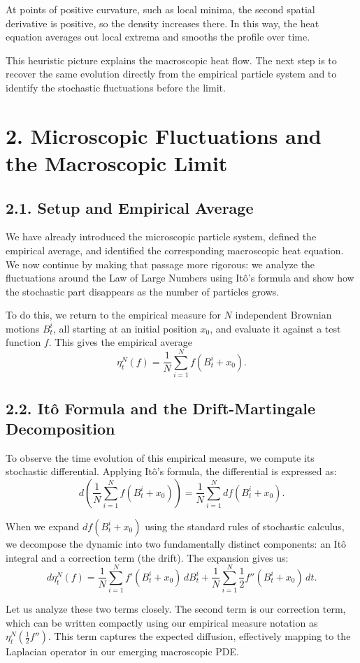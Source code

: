 \documentclass[11pt]{article}
\theoremstyle{definition}
\theoremstyle{remark}
\begin{document}
At points of positive curvature, such as local minima, the second spatial derivative is positive, so the density increases there. In this way, the heat equation averages out local extrema and smooths the profile over time.

This heuristic picture explains the macroscopic heat flow. The next step is to recover the same evolution directly from the empirical particle system and to identify the stochastic fluctuations before the limit.

\section*{2. Microscopic Fluctuations and the Macroscopic Limit}
\subsection*{2.1. Setup and Empirical Average}
We have already introduced the microscopic particle system, defined the empirical average, and identified the corresponding macroscopic heat equation. We now continue by making that passage more rigorous: we analyze the fluctuations around the Law of Large Numbers using It\^o's formula and show how the stochastic part disappears as the number of particles grows.

To do this, we return to the empirical measure for $N$ independent Brownian motions $B_t^i$, all starting at an initial position $x_0$, and evaluate it against a test function $f$. This gives the empirical average
\[
\eta_t^N(f)=\frac{1}{N}\sum_{i=1}^N f(B_t^i+x_0).
\]

\subsection*{2.2. It\^o Formula and the Drift-Martingale Decomposition}
To observe the time evolution of this empirical measure, we compute its stochastic differential. Applying It\^o's formula, the differential is expressed as:
\[
d\!\left(
\frac{1}{N}\sum_{i=1}^N f(B_t^i+x_0)
\right)
=
\frac{1}{N}\sum_{i=1}^N df(B_t^i+x_0).
\]

When we expand $df(B_t^i+x_0)$ using the standard rules of stochastic calculus, we decompose the dynamic into two fundamentally distinct components: an It\^o integral and a correction term (the drift). The expansion gives us:
\[
d\eta_t^N(f)
=
\frac{1}{N}\sum_{i=1}^N f'(B_t^i+x_0)\,dB_t^i
+
\frac{1}{N}\sum_{i=1}^N \frac{1}{2}f''(B_t^i+x_0)\,dt.
\]

Let us analyze these two terms closely. The second term is our correction term, which can be written compactly using our empirical measure notation as $\eta_t^N\!\left(\frac{1}{2}f''\right)$. This term captures the expected diffusion, effectively mapping to the Laplacian operator in our emerging macroscopic PDE.
\end{document}
